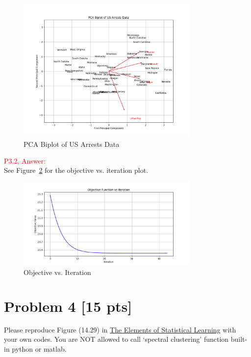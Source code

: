 \documentclass[11pt]{article}
\begin{document}
\begin{figure}[h]
	\centering
	\includegraphics[width=0.8\textwidth]{p3_1.png}
	\caption{PCA Biplot of US Arrests Data}
	\label{fig:p3_1}
	\end{figure}

\textcolor{red}{P3.2, Answer:}\\

See Figure~\ref{fig:p3_2} for the objective vs. iteration plot.

\begin{figure}[h]
	\centering
	\includegraphics[width=0.8\textwidth]{p3_2.png}
	\caption{Objective vs. Iteration}
	\label{fig:p3_2}
	\end{figure}

\clearpage	
\newpage

\section*{Problem 4 [15 pts]}
Please reproduce Figure (14.29) in \href{https://hastie.su.domains/ElemStatLearn/}{The Elements of
	Statistical Learning} with your own codes. You are NOT allowed to call `spectral clustering' function built-in python or matlab.
	
\end{document}
